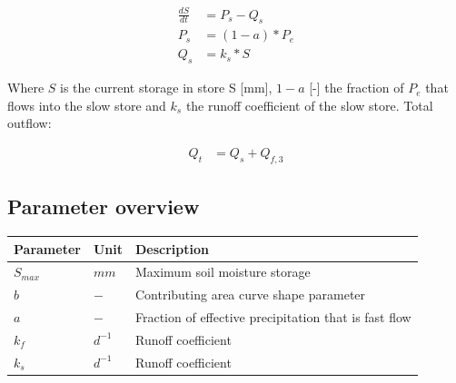 \begin{align}
	\frac{dS}{dt} &= P_s - Q_s\\
	P_s &= (1-a)*P_e \\
	Q_s &= k_s*S 
\end{align}
  
\noindent Where $S$ is the current storage in store S [mm], $1-a$ [-] the fraction of $P_e$ that flows into the slow store and $k_s$ the runoff coefficient of the slow store. Total outflow:

\begin{align}
	Q_t &= Q_s + Q_{f,3}
\end{align}

\subsection{Parameter overview}
\begin{table}[htbp]
  \centering
    \begin{tabular}{lll}
    \toprule
    Parameter & Unit  & Description \\
    \midrule
    $S_{max}$ & $mm$  & Maximum soil moisture storage \\
    $b$   & $-$   & Contributing area curve shape parameter \\
    $a$   & $-$   & Fraction of effective precipitation that is fast flow \\
    $k_f$ & $d^{-1}$ & Runoff coefficient \\
    $k_s$ & $d^{-1}$ & Runoff coefficient \\
    \bottomrule
    \end{tabular}%
  \label{tab:addlabel}%
\end{table}%
